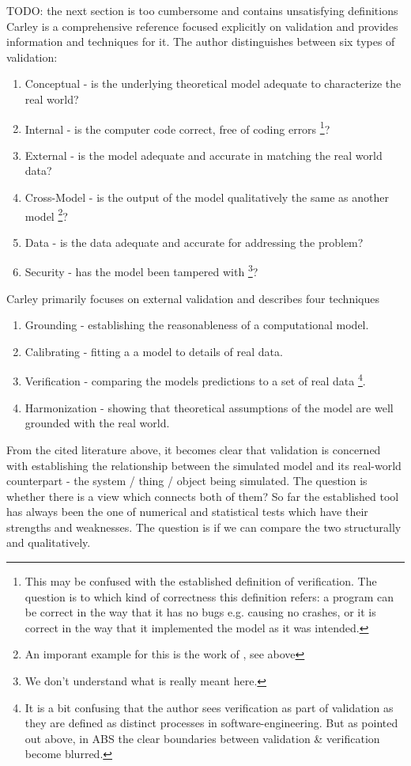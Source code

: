 TODO: the next section is too cumbersome and contains unsatisfying definitions
Carley \cite{carley_validating_1996} is a comprehensive reference focused explicitly on validation and provides information and techniques for it. The author distinguishes between six types of validation:
\begin{enumerate}
	\item Conceptual - is the underlying theoretical model adequate to characterize the real world?
	\item Internal - is the computer code correct, free of coding errors \footnote{This may be confused with the established definition of verification. The question is to which kind of correctness this definition refers: a program can be correct in the way that it has no bugs e.g. causing no crashes, or it is correct in the way that it implemented the model as it was intended.}?
	\item External - is the model adequate and accurate in matching the real world data?
	\item Cross-Model - is the output of the model qualitatively the same as another model \footnote{An imporant example for this is the work of \cite{axtell_aligning_1996}, see above}?
	\item Data - is the data adequate and accurate for addressing the problem?
	\item Security - has the model been tampered with \footnote{We don't understand what is really meant here.}?
\end{enumerate}
Carley primarily focuses on external validation and describes four techniques 
\begin{enumerate}
	\item Grounding - establishing the reasonableness of a computational model.
	\item Calibrating - fitting a a model to details of real data.
	\item Verification - comparing the models predictions to a set of real data \footnote{It is a bit confusing that the author sees verification as part of validation as they are defined as distinct processes in software-engineering. But as pointed out above, in ABS the clear boundaries between validation \& verification become blurred.}.
	\item Harmonization - showing that theoretical assumptions of the model are well grounded with the real world.
\end{enumerate}

From the cited literature above, it becomes clear that validation is concerned with establishing the relationship between the simulated model and its real-world counterpart - the system / thing / object being simulated. The question is whether there is a view which connects both of them? So far the established tool has always been the one of numerical and statistical tests which have their strengths and weaknesses. The question is if we can compare the two structurally and qualitatively. 

